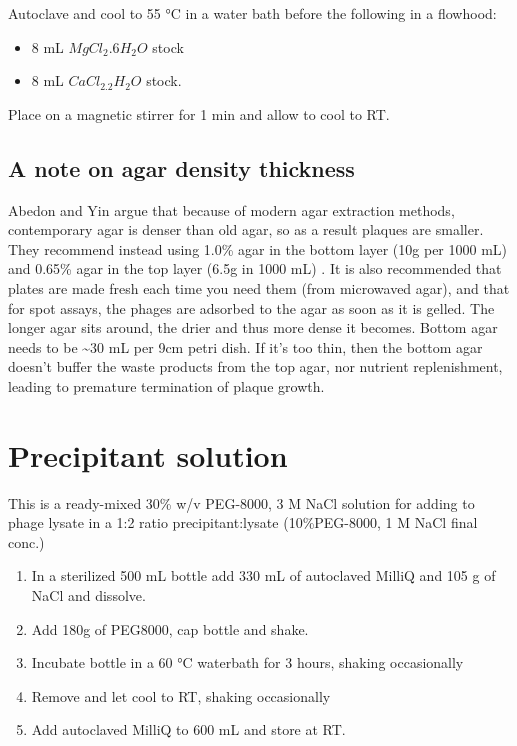 \documentclass[
]{book}
\providecommand{\tightlist}{%
  \setlength{\itemsep}{0pt}\setlength{\parskip}{0pt}}
\begin{document}
Autoclave and cool to 55 °C in a water bath before the following in a flowhood:

\begin{itemize}
\tightlist
\item
  8 mL \(MgCl_{2}.6H_{2}O\) stock
\item
  8 mL \(CaCl_2.2H_{2}O\) stock.
\end{itemize}

Place on a magnetic stirrer for 1 min and allow to cool to RT.

\hypertarget{a-note-on-agar-density-thickness}{%
\subsection{A note on agar density thickness}\label{a-note-on-agar-density-thickness}}

Abedon and Yin argue that because of modern agar extraction methods, contemporary agar is denser than old agar, so as a result plaques are smaller. They recommend instead using 1.0\% agar in the bottom layer (10g per 1000 mL) and 0.65\% agar in the top layer (6.5g in 1000 mL) \citep{Abedon2009-zt}. It is also recommended that plates are made fresh each time you need them (from microwaved agar), and that for spot assays, the phages are adsorbed to the agar as soon as it is gelled. The longer agar sits around, the drier and thus more dense it becomes. Bottom agar needs to be \textasciitilde30 mL per 9cm petri dish. If it's too thin, then the bottom agar doesn't buffer the waste products from the top agar, nor nutrient replenishment, leading to premature termination of plaque growth.

\hypertarget{precipitant-solution}{%
\section{Precipitant solution}\label{precipitant-solution}}

This is a ready-mixed 30\% w/v PEG-8000, 3 M NaCl solution for adding to phage lysate in a 1:2 ratio precipitant:lysate (10\%PEG-8000, 1 M NaCl final conc.)

\begin{enumerate}
\def\labelenumi{\arabic{enumi}.}
\tightlist
\item
  In a sterilized 500 mL bottle add 330 mL of autoclaved MilliQ and 105 g of NaCl and dissolve.
\item
  Add 180g of PEG8000, cap bottle and shake.
\item
  Incubate bottle in a 60 °C waterbath for 3 hours, shaking occasionally
\item
  Remove and let cool to RT, shaking occasionally
\item
  Add autoclaved MilliQ to 600 mL and store at RT.
\end{enumerate}
\end{document}
